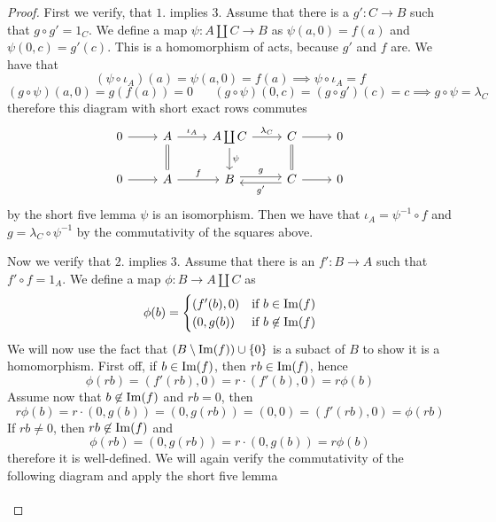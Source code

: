 \begin{proof}[Proof]First we verify, that $1.$ implies $3.$
    Assume that there is a $g':C \to B$ such that $g\circ g' = 1_C$. We define a map $\psi: A\coprod C \to B$ as 
    $\psi(a,0) = f(a)$ and $\psi(0,c) = g'(c)$. This is a homomorphism of acts, because $g'$ and $f$ are. We have that 
    \[
        (\psi\circ \iota_A)(a) = \psi(a,0) = f(a) \implies \psi\circ\iota_A = f
    \]
    \[
        (g\circ\psi)(a,0) = g(f(a)) = 0\hspace{20pt} (g\circ\psi)(0,c) = (g\circ g')(c) = c \implies g\circ\psi = \lambda_C
    \]
    therefore this diagram with short exact rows commutes
    \[\begin{tikzcd}
	0 & A & {A\coprod C} & C & 0 \\
	0 & A & B & C & 0
	\arrow[from=1-1, to=1-2]
	\arrow["{\iota_A}", from=1-2, to=1-3]
	\arrow[equal,from=1-2, to=2-2]
	\arrow["{\lambda_C}", from=1-3, to=1-4]
	\arrow["\psi", from=1-3, to=2-3]
	\arrow[from=1-4, to=1-5]
	\arrow[equal,from=1-4, to=2-4]
	\arrow[from=2-1, to=2-2]
	\arrow["f", from=2-2, to=2-3]
	\arrow["g", shift left, from=2-3, to=2-4]
	\arrow["{g'}", shift left, from=2-4, to=2-3]
	\arrow[from=2-4, to=2-5]
\end{tikzcd}\]
    by the short five lemma $\psi$ is an isomorphism. Then we have that $\iota_A = \psi^{-1}\circ f$ and $g = \lambda_C\circ\psi^{-1}$ 
    by the commutativity of the squares above.\par 
    Now we verify that $2.$ implies $3.$ Assume that there is an $f': B \to A$ such that $f'\circ f = 1_A$. We define a map $\phi: B \to A\coprod C$ as
    \[
        \phi(b) = \begin{cases}
            (f'(b),0) & \text{if } b\in\mathrm{Im}(f) \\
            (0,g(b)) & \text{if } b\not\in\mathrm{Im}(f)
        \end{cases}
    \]
    We will now use the fact that $(B\setminus\mathrm{Im}(f))\cup\{0\}$ is a subact of $B$ to show it is a homomorphism. First off, if 
    $b\in\mathrm{Im}(f)$, then $rb\in\mathrm{Im}(f)$, hence 
    \[
    \phi(rb) = (f'(rb),0)= r\cdot(f'(b),0) = r\phi(b)
    \]
    Assume now that $b\not\in\mathrm{Im}(f)$ and $rb=0$, then 
    \[
        r\phi(b) = r\cdot(0,g(b)) = (0,g(rb)) = (0,0) = (f'(rb),0) = \phi(rb)
    \]
    If $rb\neq 0$, then $rb\not\in\mathrm{Im}(f)$ and 
    \[
        \phi(rb) = (0,g(rb)) = r\cdot(0,g(b)) = r\phi(b)
    \]
    therefore it is well-defined. We will again verify the commutativity of the following diagram and apply the short five lemma
    \[\begin{tikzcd}

\end{tikzcd}\]
\end{proof}
